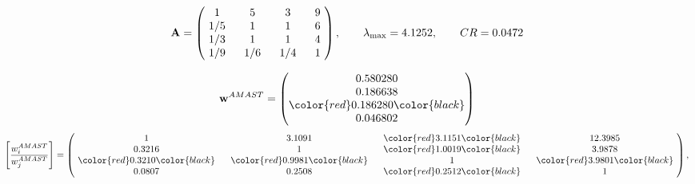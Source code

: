 \begin{example}
\begin{equation*}
\mathbf{A} =
\begin{pmatrix}
$\,\,$ 1 $\,\,$ & $\,\,$5$\,\,$ & $\,\,$3$\,\,$ & $\,\,$9 $\,\,$ \\
$\,\,$ 1/5$\,\,$ & $\,\,$ 1 $\,\,$ & $\,\,$1$\,\,$ & $\,\,$6 $\,\,$ \\
$\,\,$ 1/3$\,\,$ & $\,\,$ 1 $\,\,$ & $\,\,$ 1 $\,\,$ & $\,\,$4 $\,\,$ \\
$\,\,$ 1/9$\,\,$ & $\,\,$ 1/6$\,\,$ & $\,\,$ 1/4$\,\,$ & $\,\,$ 1  $\,\,$ \\
\end{pmatrix},
\qquad
\lambda_{\max} =
4.1252,
\qquad
CR = 0.0472
\end{equation*}

\begin{equation*}
\mathbf{w}^{AMAST} =
\begin{pmatrix}
0.580280\\
0.186638\\
\color{red} 0.186280\color{black} \\
0.046802
\end{pmatrix}\end{equation*}
\begin{equation*}
\left[ \frac{{w}^{AMAST}_i}{{w}^{AMAST}_j} \right] =
\begin{pmatrix}
$\,\,$ 1 $\,\,$ & $\,\,$3.1091$\,\,$ & $\,\,$\color{red} 3.1151\color{black} $\,\,$ & $\,\,$12.3985$\,\,$ \\
$\,\,$0.3216$\,\,$ & $\,\,$ 1 $\,\,$ & $\,\,$\color{red} 1.0019\color{black} $\,\,$ & $\,\,$3.9878  $\,\,$ \\
$\,\,$\color{red} 0.3210\color{black} $\,\,$ & $\,\,$\color{red} 0.9981\color{black} $\,\,$ & $\,\,$ 1 $\,\,$ & $\,\,$\color{red} 3.9801\color{black}  $\,\,$ \\
$\,\,$0.0807$\,\,$ & $\,\,$0.2508$\,\,$ & $\,\,$\color{red} 0.2512\color{black} $\,\,$ & $\,\,$ 1  $\,\,$ \\
\end{pmatrix},
\end{equation*}


\end{example}
